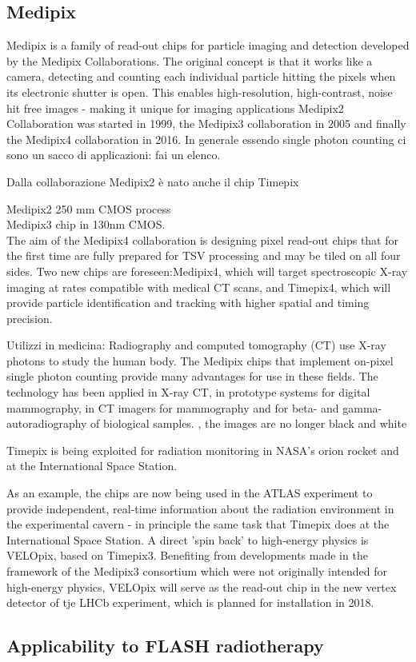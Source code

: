     \subsection{Medipix}
    Medipix is a family of read-out chips for particle imaging and detection developed by the Medipix Collaborations. The original concept is that it works like a camera, detecting and counting each individual particle hitting the pixels when its electronic shutter is open. This enables high-resolution, high-contrast, noise hit free images - making it unique for imaging applications
    Medipix2 Collaboration was started in 1999, the Medipix3 collaboration in 2005 and finally the Medipix4 collaboration in 2016. 
    In generale essendo single photon counting ci sono un sacco di applicazioni: fai un elenco. 

    Dalla collaborazione Medipix2 è nato anche il chip Timepix

    Medipix2 250 mm CMOS process\\
    Medipix3 chip in 130nm CMOS.\\
    The aim of the Medipix4 collaboration is designing pixel read-out chips that for the first time are fully prepared for TSV processing and may be tiled on all four sides. 
    Two new chips are foreseen:Medipix4, which will target spectroscopic X-ray imaging at rates compatible with medical CT scans, and Timepix4, which will provide particle identification and tracking with higher spatial and timing precision.

    Utilizzi in medicina: 
    Radiography and computed tomography (CT) use X-ray photons to study the human body. The Medipix chips that implement on-pixel single photon counting provide many advantages for use in these fields. The technology has been applied in X-ray CT, in prototype systems for digital mammography, in CT imagers for mammography and for beta- and gamma-autoradiography of biological samples. , the images are no longer black and white

    Timepix is being exploited for radiation monitoring in NASA's orion rocket and at the International Space Station. 

    As an example, the chips are now being used in the ATLAS experiment to provide independent, real-time information about the radiation environment in the experimental cavern - in principle the same task that Timepix does at the International Space Station. A direct 'spin back' to high-energy physics is VELOpix, based on Timepix3. Benefiting from developments made in the framework of the Medipix3 consortium which were not originally intended for high-energy physics, VELOpix will serve as the read-out chip in the new vertex detector of tje LHCb experiment, which is planned for installation in 2018.
    
    
    \subsection{Applicability to FLASH radiotherapy}